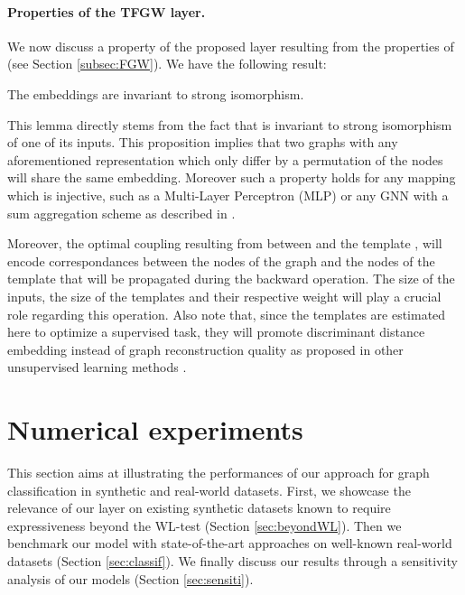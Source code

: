 \documentclass{article}
\begin{document}
 
 
\paragraph{Properties of the TFGW layer.} We now discuss a property of the proposed layer 
resulting from the properties of  (see Section \ref{subsec:FGW}). We have the following result:
\begin{lemma}
	The  embeddings are invariant to strong isomorphism.
\end{lemma}
This lemma directly stems from the fact that  is invariant to strong isomorphism of one of its inputs. This proposition implies that two graphs with any aforementioned representation which only differ by a permutation of the nodes will share the same  embedding. 
Moreover such a property holds for any mapping  which is
injective, such as a Multi-Layer Perceptron (MLP)
\cite{hornik1989multilayer} or any GNN with a sum aggregation scheme as described in \cite{xu2018powerful}. 

Moreover, the optimal coupling  resulting from  between  and the template , will encode correspondances between the nodes of the graph and the nodes of the template that will be propagated during the backward operation. The size of the inputs, the size of the templates and their respective weight  will play a crucial role regarding this operation.
Also note that, since the templates are estimated here to optimize a supervised task, they will promote discriminant distance embedding instead of graph reconstruction quality as proposed in other  unsupervised learning methods
\cite{vincent2021online, vincent-cuaz2022semirelaxed}.  








 	\label{sec:model}
	
	\section{Numerical experiments}
	



This section aims at illustrating the performances of our approach for graph classification in synthetic and real-world datasets. First, we showcase the relevance of our  layer on existing synthetic datasets known to require expressiveness beyond the WL-test (Section \ref{sec:beyondWL}). Then we benchmark our model with state-of-the-art approaches on well-known real-world datasets (Section \ref{sec:classif}). We finally discuss our results through a sensitivity analysis of our models (Section \ref{sec:sensiti}).
\end{document}
